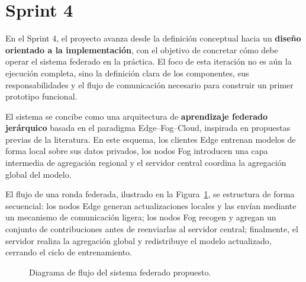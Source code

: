 \documentclass{report}
\begin{document}
\section{Sprint 4}
\label{sect:Sp4}
En el Sprint 4, el proyecto avanza desde la definición conceptual hacia un \textbf{diseño orientado a la implementación}, con el objetivo de concretar cómo debe operar el sistema federado en la práctica. El foco de esta iteración no es aún la ejecución completa, sino la definición clara de los componentes, sus responsabilidades y el flujo de comunicación necesario para construir un primer prototipo funcional.

El sistema se concibe como una arquitectura de \textbf{aprendizaje federado jerárquico} basada en el paradigma Edge--Fog--Cloud, inspirada en propuestas previas de la literatura. En este esquema, los clientes Edge entrenan modelos de forma local sobre sus datos privados, los nodos Fog introducen una capa intermedia de agregación regional y el servidor central coordina la agregación global del modelo.

El flujo de una ronda federada, ilustrado en la Figura~\ref{fig:flow_diagram}, se estructura de forma secuencial: los nodos Edge generan actualizaciones locales y las envían mediante un mecanismo de comunicación ligera; los nodos Fog recogen y agregan un conjunto de contribuciones antes de reenviarlas al servidor central; finalmente, el servidor realiza la agregación global y redistribuye el modelo actualizado, cerrando el ciclo de entrenamiento.

\begin{figure}[H]
\centering
{}
\caption{Diagrama de flujo del sistema federado propuesto.}
\label{fig:flow_diagram}
\end{figure}
\end{document}
